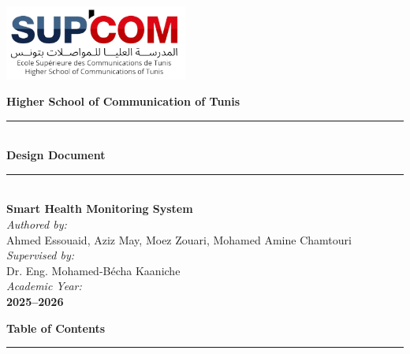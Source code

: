 \documentclass[12pt,a4paper]{article}
\begin{document}
\begin{titlepage}
\centering
\vspace*{cm}

\includegraphics[width=6cm]{Images/Supcom.png}

\vspace{0.5cm}

{\Large \textbf{Higher School of Communication of Tunis}}\\[2cm]

{\color{primaryblue}\rule{0.75\textwidth}{1.2pt}}\\[0.5cm]
{\Huge \bfseries\color{primaryblue} Design Document}\\[0.5cm]
{\color{primaryblue}\rule{0.75\textwidth}{1.2pt}}\\[2.5cm]

{\Large\color{accentred}\textbf{Smart Health Monitoring System}}\\[3cm]

{\small \textit{Authored by:}}\\[0.4cm]
{\large Ahmed Essouaid, Aziz May, Moez Zouari, Mohamed Amine Chamtouri}\\[2cm]

{\small \textit{Supervised by:}}\\[0.4cm]
{\large Dr. Eng. Mohamed-Bécha Kaaniche}\\[2cm]

{\small \textit{Academic Year:}}\\[0.4cm]
{\large\bfseries 2025--2026}

\vfill
\end{titlepage}

\newpage
{}
\setcounter{page}{1}
\thispagestyle{fancy}
\begin{center}
\vspace*{2cm}
{\Huge\bfseries\color{primaryblue} Table of Contents}\\[0.3cm]
\color{accentred}\rule{0.5\textwidth}{1.5pt}
\end{center}
\vspace{1cm}
\tableofcontents
\newpage
\end{document}
